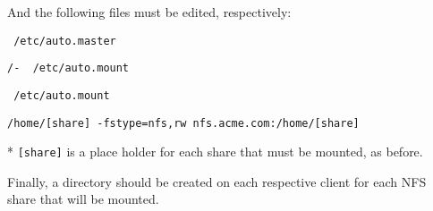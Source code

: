 \noindent
And the following files must be edited, respectively: \\

\begin{lstlisting}
 /etc/auto.master
\end{lstlisting}
\vspace{1em}

\begin{lstlisting}[backgroundcolor=\color{Gray}]
 /-  /etc/auto.mount
\end{lstlisting}

\begin{lstlisting}
 /etc/auto.mount
\end{lstlisting}
\vspace{1em}

\begin{lstlisting}[backgroundcolor=\color{Gray}]
 /home/[share] -fstype=nfs,rw nfs.acme.com:/home/[share]
\end{lstlisting}
* \lstinline$[share]$ is a place holder for each share that must be mounted, 
as before.
\vspace{1em}

\noindent
Finally, a directory should be created on each respective client for each NFS
share that will be mounted. \\
